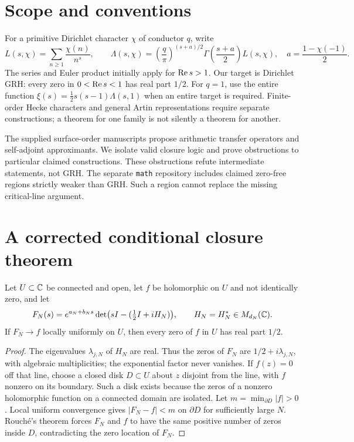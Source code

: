 \section{Scope and conventions}
For a primitive Dirichlet character $\chi$ of conductor $q$, write
\[
 L(s,\chi)=\sum_{n\ge1}\frac{\chi(n)}{n^s},\qquad
 \Lambda(s,\chi)=\left(\frac q\pi\right)^{(s+a)/2}
 \Gamma\left(\frac{s+a}{2}\right)L(s,\chi),\quad
 a=\frac{1-\chi(-1)}2.
\]
The series and Euler product initially apply for $\operatorname{Re} s>1$.
Our target is Dirichlet GRH: every zero in $0<\operatorname{Re} s<1$ has real part $1/2$.
For $q=1$, use the entire function
$\xi(s)=\tfrac12s(s-1)\Lambda(s,1)$ when an entire target is required.
Finite-order Hecke characters and general Artin representations require separate constructions;
a theorem for one family is not silently a theorem for another.

The supplied surface-order manuscripts \cite{surface,grhsource} propose
arithmetic transfer operators and self-adjoint approximants. We isolate
valid closure logic and prove obstructions to particular claimed constructions.
These obstructions refute intermediate statements, not GRH.
The separate \texttt{math} repository \cite{mathsource} includes claimed zero-free
regions strictly weaker than GRH. Such a region cannot replace the missing critical-line argument.

\section{A corrected conditional closure theorem}
\begin{theorem}\label{thm:closure}
Let $U\subset\mathbb C$ be connected and open, let $f$ be holomorphic on $U$ and
not identically zero, and let
\[
 F_N(s)=e^{a_N+b_Ns}\det\bigl(sI-(\tfrac12 I+iH_N)\bigr),
 \qquad H_N=H_N^*\in M_{d_N}(\mathbb C).
\]
If $F_N\to f$ locally uniformly on $U$, then every zero of $f$ in $U$
has real part $1/2$.
\end{theorem}
\begin{proof}
The eigenvalues $\lambda_{j,N}$ of $H_N$ are real. Thus the zeros of $F_N$
are $1/2+i\lambda_{j,N}$, with algebraic multiplicities; the exponential
factor never vanishes. If $f(z)=0$ off that line, choose a closed disk
$D\subset U$ about $z$ disjoint from the line, with $f$ nonzero on its
boundary. Such a disk exists because the zeros of a nonzero holomorphic
function on a connected domain are isolated. Let
$m=\min_{\partial D}|f|>0$. Local uniform convergence gives
$|F_N-f|<m$ on $\partial D$ for sufficiently large $N$.
Rouch\'e's theorem forces $F_N$ and $f$ to have the same positive number
of zeros inside $D$, contradicting the zero location of $F_N$.
\end{proof}

